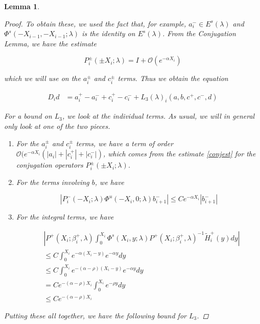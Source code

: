 \documentclass[12pt]{article}
\newtheorem{lemma}{Lemma}
\begin{document}
\begin{lemma}
\begin{proof}
To obtain these, we used the fact that, for example, $a_i^- \in E^s(\lambda)$ and $\Phi^s(-X_{i-1}, -X_{i-1}; \lambda)$ is the identity on $E^s(\lambda)$. From the Conjugation Lemma, we have the estimate

\begin{equation}\label{conjest}
P_i^\pm(\pm X_i; \lambda) = I + \mathcal{O}(e^{-\alpha X_i})
\end{equation}

which we will use on the $a_i^\pm$ and $c_i^\pm$ terms. Thus we obtain the equation

\begin{align}\label{Dideq1}
D_i d &= a_i^+ - a_i^- + c_i^+ - c_i^- + L_3(\lambda)_i(a, b, c^+, c^-, d)
\end{align}

For a bound on $L_3$, we look at the individual terms. As usual, we will in general only look at one of the two pieces.

\begin{enumerate}

\item For the $a_i^\pm$ and $c_i^\pm$ terms, we have a term of order $\mathcal{O}(e^{-\alpha X_i}(|a_i| + |c_i^+| + |c_i^-|)$, which comes from the estimate \eqref{conjest} for the conjugation operators $P_i^\pm(\pm X_i; \lambda)$.

\item For the terms involving $b$, we have

\[
| P_i^-(-X_i; \lambda) \Phi^u(-X_i, 0; \lambda) b_{i+1}^-| \leq C e^{-\alpha X_i} |b_{i+1}
^-|
\]

\item For the integral terms, we have

\begin{align*}
&\left|
P^+(X_i; \beta_i^+, \lambda) \int_0^{X_i} \Phi^s(X_i, y; \lambda) P^+(X_i; \beta_i^+, \lambda)^{-1} \tilde{H}_i^+(y) dy \right| \\
&\leq C \int_0^{X_i} e^{-\alpha(X_i - y)}e^{-\alpha y} dy \\
&\leq C \int_0^{X_i} e^{-(\alpha - \rho)(X_i - y)}e^{-\alpha y} dy \\
&= C e^{-(\alpha - \rho) X_i} \int_0^{X_i} e^{-\rho y} dy \\ 
&\leq C e^{-(\alpha - \rho) X_i} 
\end{align*}

\end{enumerate}

Putting these all together, we have the following bound for $L_3$.


\end{proof}
\end{lemma}
\end{document}
